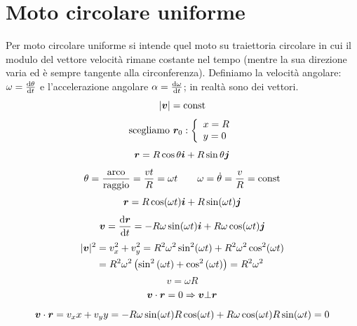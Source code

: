 \section{Moto circolare uniforme}
Per moto circolare uniforme si intende quel moto su traiettoria
circolare in cui il modulo del vettore velocità rimane costante
nel tempo (mentre la sua direzione varia ed è sempre tangente
alla circonferenza). Definiamo la velocità angolare: $\omega=\frac{\mathrm{d}\theta}{\mathrm{d} t}$ e l'accelerazione angolare $\alpha=\frac{\mathrm{d} \omega}{\mathrm{d} t}$; in realtà sono dei vettori.
\begin{equation*}\left|\boldsymbol{v}\right|=\text{const}\end{equation*}
\begin{equation*}\text{scegliamo $\boldsymbol{r}_0$}:\left\{
\begin{array}{l}
x=R\\
y=0\\
\end{array}\right.\end{equation*}
\begin{equation*}\boldsymbol{r}=R\cos\theta\boldsymbol{i}+R\sin\theta\boldsymbol{j}\end{equation*}
\begin{equation*}\theta=\frac{\text{arco}}{\text{raggio}}=\frac{vt}{R}=\omega t\qquad\omega=\dot\theta=\frac{v}{R}=\text{const}\end{equation*}
\begin{equation*}\boldsymbol{r}=R\cos(\omega t)\boldsymbol{i}+R\sin(\omega t)\boldsymbol{j}\end{equation*}
\begin{equation*}\boldsymbol{v}=\frac{\mathrm{d} \boldsymbol{r}}{\mathrm{d} t}=-R\omega\sin(\omega t)\boldsymbol{i}+R\omega\cos(\omega t)\boldsymbol{j}\end{equation*}
\begin{align*}|\boldsymbol{v}|^2&=v_x^2+v_y^2=R^2\omega^2\sin^2(\omega
t)+R^2\omega^2\cos^2(\omega t)\\
&=R^2\omega^2\left(\sin^2\left(\omega t\right)+\cos^2\left(\omega
t\right)\right)=R^2\omega^2
\end{align*}
\begin{equation*}v=\omega R\end{equation*}
\begin{equation*}\boldsymbol{v}\cdot\boldsymbol{r}=0\Rightarrow\boldsymbol{v}\bot\boldsymbol{r}\end{equation*}
\begin{equation*}\boldsymbol{v}\cdot\boldsymbol{r}=v_xx+v_yy=-R\omega\sin(\omega t)R\cos(\omega t)+R\omega\cos(\omega t)R\sin(\omega t)=0\end{equation*}
